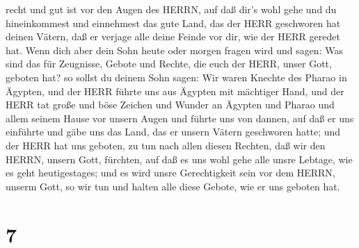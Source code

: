 recht und gut ist vor den Augen des HERRN, auf daß dir's wohl gehe und
du hineinkommest und einnehmest das gute Land, das der HERR geschworen
hat deinen Vätern,  daß er verjage alle deine Feinde vor
dir, wie der HERR geredet hat.  Wenn dich aber dein Sohn
heute oder morgen fragen wird und sagen: Was sind das für Zeugnisse,
Gebote und Rechte, die euch der HERR, unser Gott, geboten hat?
 so sollst du deinem Sohn sagen: Wir waren Knechte des
Pharao in Ägypten, und der HERR führte uns aus Ägypten mit mächtiger
Hand,  und der HERR tat große und böse Zeichen und Wunder
an Ägypten und Pharao und allem seinem Hause vor unsern Augen
 und führte uns von dannen, auf daß er uns einführte und
gäbe uns das Land, das er unsern Vätern geschworen hatte; 
und der HERR hat uns geboten, zu tun nach allen diesen Rechten, daß wir
den HERRN, unsern Gott, fürchten, auf daß es uns wohl gehe alle unsre
Lebtage, wie es geht heutigestages;  und es wird unsre
Gerechtigkeit sein vor dem HERRN, unserm Gott, so wir tun und halten
alle diese Gebote, wie er uns geboten hat.

\hypertarget{section-6}{%
\section{7}\label{section-6}}

